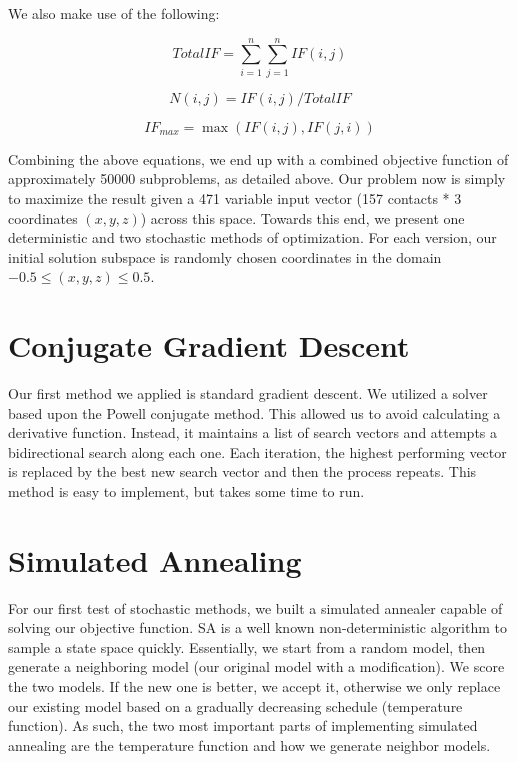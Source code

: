 \documentclass{article}
\begin{document}
We also make use of the following:

\begin{equation}
      TotalIF = \sum_{i=1}^{n} \sum_{j=1}^{n} IF(i,j)
\end{equation}

\begin{equation}
      N(i,j) = IF(i,j)/TotalIF
\end{equation}

\begin{equation}
      IF_{max} = \max(IF(i,j),IF(j,i))
\end{equation}

Combining the above equations, we end up with a combined objective function of approximately 50000 subproblems, as detailed above.  Our problem now is simply to maximize the result given a 471 variable input vector (157 contacts * 3 coordinates $(x, y, z)$) across this space.  Towards this end, we present one deterministic and two stochastic methods of optimization.  For each version, our initial solution subspace is randomly chosen coordinates in the domain $-0.5 \leq (x, y, z) \leq 0.5$. 

\section{Conjugate Gradient Descent}

Our first method we applied is standard gradient descent.  We utilized a solver based upon the Powell conjugate method.  This allowed us to avoid calculating a derivative function.  Instead, it maintains a list of search vectors and attempts a bidirectional search along each one.  Each iteration, the highest performing vector is replaced by the best new search vector and then the process repeats.  This method is easy to implement, but takes some time to run.

\section{Simulated Annealing}

For our first test of stochastic methods, we built a simulated annealer capable of solving our objective function.  SA is a well known non-deterministic algorithm to sample a state space quickly.  Essentially, we start from a random model, then generate a neighboring model (our original model with a modification).  We score the two models.  If the new one is better, we accept it, otherwise we only replace our existing model based on a gradually decreasing schedule (temperature function).  As such, the two most important parts of implementing simulated annealing are the temperature function and how we generate neighbor models.
\end{document}
